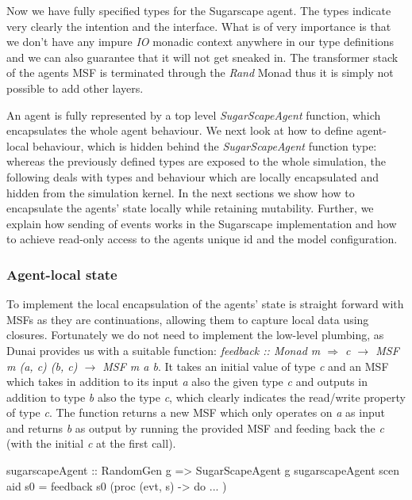 Now we have fully specified types for the Sugarscape agent. The types indicate very clearly the intention and the interface. What is of very importance is that we don't have any impure \textit{IO} monadic context anywhere in our type definitions and we can also guarantee that it will not get sneaked in. The transformer stack of the agents MSF is terminated through the \textit{Rand} Monad thus it is simply not possible to add other layers. 

An agent is fully represented by a top level \textit{SugarScapeAgent} function, which encapsulates the whole agent behaviour. We next look at how to define agent-local behaviour, which is hidden behind the \textit{SugarScapeAgent} function type: whereas the previously defined types are exposed to the whole simulation, the following deals with types and behaviour which are locally encapsulated and hidden from the simulation kernel. In the next sections we show how to encapsulate the agents' state locally while retaining mutability. Further, we explain how sending of events works in the Sugarscape implementation and how to achieve read-only access to the agents unique id and the model configuration.

\subsubsection{Agent-local state}
To implement the local encapsulation of the agents' state is straight forward with MSFs as they are continuations, allowing them to capture local data using closures. Fortunately we do not need to implement the low-level plumbing, as Dunai provides us with a suitable function: \textit{feedback :: Monad m $\Rightarrow$ c $\rightarrow$ MSF m (a, c) (b, c) $\rightarrow$ MSF m a b}. It takes an initial value of type \textit{c} and an MSF which takes in addition to its input \textit{a} also the given type \textit{c} and outputs in addition to type \textit{b} also the type \textit{c}, which clearly indicates the read/write property of type \textit{c}. The function returns a new MSF which only operates on \textit{a} as input and returns \textit{b} as output by running the provided MSF and feeding back the \textit{c} (with the initial \textit{c} at the first call).

\begin{HaskellCode}
sugarscapeAgent :: RandomGen g => SugarScapeAgent g
sugarscapeAgent scen aid s0 = feedback s0 (proc (evt, s) -> do ... )
\end{HaskellCode}

